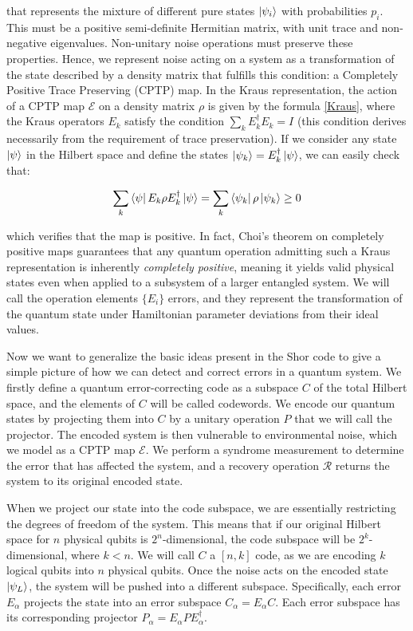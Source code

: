 \documentclass[12pt, twoside, openany]{book}
\begin{document}
that represents the mixture of different pure states $\ket{ \psi_i }$ with probabilities $p_i$. This must be a positive semi-definite Hermitian matrix, with unit trace and non-negative eigenvalues. Non-unitary noise operations must preserve these properties. Hence, we represent noise acting on a system as a transformation of the state described by a density matrix that fulfills this condition: a Completely Positive Trace Preserving (CPTP) map. In the Kraus representation, the action of a CPTP map $\mathcal{E}$ on a density matrix $\rho$ is given by the formula \ref{Kraus}, where the Kraus operators $E_k$ satisfy the condition $\sum_k E_k^\dagger E_k = I$ (this condition derives necessarily from the requirement of trace preservation). If we consider any state $\ket{\psi}$ in the Hilbert space and define the states $ \ket{\psi _k} = E_k^\dagger \ket{\psi} $, we can easily check that: 

\begin{align*}
    \sum_k \bra{\psi} E_k \rho E_k^\dagger \ket{\psi} = \sum_k \bra{\psi_k} \rho \ket{\psi_k} \geq 0
\end{align*}

which verifies that the map is positive. In fact, Choi's theorem on completely positive maps guarantees that any quantum operation admitting such a Kraus representation is inherently \textit{completely positive}, meaning it yields valid physical states even when applied to a subsystem of a larger entangled system. We will call the operation elements $\{E_i\}$ errors, and they represent the transformation of the quantum state under Hamiltonian parameter deviations from their ideal values. 

Now we want to generalize the basic ideas present in the Shor code to give a simple picture of how we can detect and correct errors in a quantum system. We firstly define a quantum error-correcting code as a subspace $C$ of the total Hilbert space, and the elements of $C$ will be called codewords. We encode our quantum states by projecting them into $C$ by a unitary operation $P$ that we will call the projector. The encoded system is then vulnerable to environmental noise, which we model as a CPTP map $\mathcal{E}$. We perform a syndrome measurement to determine the error that has affected the system, and a recovery operation $\mathcal{R}$ returns the system to its original encoded state. 

When we project our state into the code subspace, we are essentially restricting the degrees of freedom of the system. This means that if our original Hilbert space for $n$ physical qubits is $2^n$-dimensional, the code subspace will be $2^k$-dimensional, where $k < n$. We will call $C$ a $[n,k]$ code, as we are encoding $k$ logical qubits into $n$ physical qubits. Once the noise acts on the encoded state $\ket{\psi_L}$, the system will be pushed into a different subspace. Specifically, each error $E_\alpha$ projects the state into an error subspace $C_\alpha = E_\alpha C$. Each error subspace has its corresponding projector $P_\alpha = E_\alpha P E_\alpha^\dagger$. 
\end{document}
